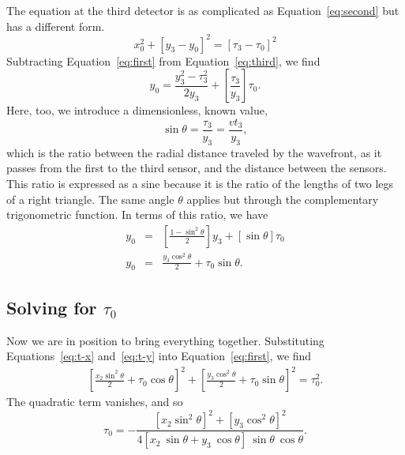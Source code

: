 \documentclass[twocolumn]{article}
\begin{document}
The equation at the third detector is as complicated as
Equation~\ref{eq:second} but has a different form.
\begin{equation}
   x_0^2 + [y_3 - y_0]^2 = [\tau_3 - \tau_0]^2
   \label{eq:third}
\end{equation}
Subtracting Equation~\ref{eq:first} from Equation~\ref{eq:third}, we find
\begin{equation}
   y_0 = \frac{y_3^2 - \tau_3^2}{2 y_3} + \left[\frac{\tau_3}{y_3}\right]
   \tau_0.
\end{equation}
Here, too, we introduce a dimensionless, known value,
\begin{equation}
   \sin\theta = \frac{\tau_3}{y_3} = \frac{v t_3}{y_3},
\end{equation}
which is the ratio between the radial distance traveled by the wavefront, as it
passes from the first to the third sensor, and the distance between the
sensors.  This ratio is expressed as a sine because it is the ratio of the
lengths of two legs of a right triangle.  The same angle $\theta$ applies but
through the complementary trigonometric function.  In terms of this ratio, we
have
\begin{eqnarray}
   y_0 &=& \left[\frac{1 - \sin^2\theta}{2}\right] y_3 + [\sin\theta]\tau_0\\
   y_0 &=& \frac{y_3\cos^2\theta}{2} + \tau_0\sin\theta.
   \label{eq:t-y}
\end{eqnarray}

\subsection{Solving for $\tau_0$}

Now we are in position to bring everything together. Substituting
Equations~\ref{eq:t-x} and~\ref{eq:t-y} into Equation~\ref{eq:first}, we find
\begin{eqnarray}
   \left[\frac{x_2\sin^2\theta}{2} + \tau_0\cos\theta\right]^2
   + \left[\frac{y_3\cos^2\theta}{2} + \tau_0\sin\theta\right]^2
   = \tau_0^2.
\end{eqnarray}
The quadratic term vanishes, and so
\begin{equation}
   \tau_0 =
      -\frac{
         \left[x_2\sin^2\theta\right]^2 +
         \left[y_3\cos^2\theta\right]^2}{
         4[x_2\:\sin\theta + y_3\:\cos\theta]\:\sin\theta\:\cos\theta}.
\end{equation}

%
%
%
%

\newpage


\end{document}
